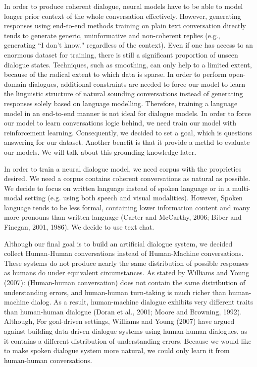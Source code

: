 \documentclass[bsc,frontabs,twoside,singlespacing,parskip,deptreport]{infthesis}     %
\begin{document}
In order to produce coherent dialogue, neural models have to be able to model longer prior context of the whole conversation effectively. However, generating responses using end-to-end methods training on plain text conversation directly tends to generate generic, uninformative and non-coherent replies (e.g., generating ``I don’t know." regardless of the context). Even if one has access to an enormous dataset for training, there is still a significant proportion of unseen dialogue states. Techniques, such as smoothing, can only help to a limited extent, because of the radical extent to which data is sparse. In order to perform open-domain dialogues, additional constraints are needed to force our model to learn the linguistic structure of natural sounding conversations instead of generating responses solely based on language modelling. Therefore, training a language model in an end-to-end manner is not ideal for dialogue models. In order to force our model to learn conversations logic behind, we need train our model with reinforcement learning. Consequently, we decided to set a goal, which is questions answering for our dataset. Another benefit is that it provide a methd to evaluate our models. We will talk about this grounding knowledge later.

In order to train a neural dialogue model, we need corpus with the proprieties desired. We need a corpus contains coherent conversations as natural as possible. We decide to focus on written language instead of spoken language or in a multi-modal setting (e.g. using both speech and visual modalities). However, Spoken language tends to be less formal, containing lower information content and many more pronouns than written language (Carter and McCarthy, 2006; Biber and Finegan, 2001, 1986). We decide to use text chat.

Although our final goal is to build an artificial dialogue system, we decided collect Human-Human conversations instead of Human-Machine conversations. These systems do not produce nearly the same distribution of possible responses as humans do under equivalent circumstances. As stated by Williams and Young (2007): (Human-human conversation) does not contain the same distribution of understanding errors, and human-human turn-taking is much richer than human-machine dialog. As a result, human-machine dialogue exhibits very different traits than human-human dialogue (Doran et al., 2001; Moore and Browning, 1992). Although, For goal-driven settings, Williams and Young (2007) have argued against building data-driven dialogue systems using human-human dialogues, as it contains a different distribution of understanding errors. Because we would like to make spoken dialogue system more natural, we could only learn it from human-human conversations.
\end{document}
